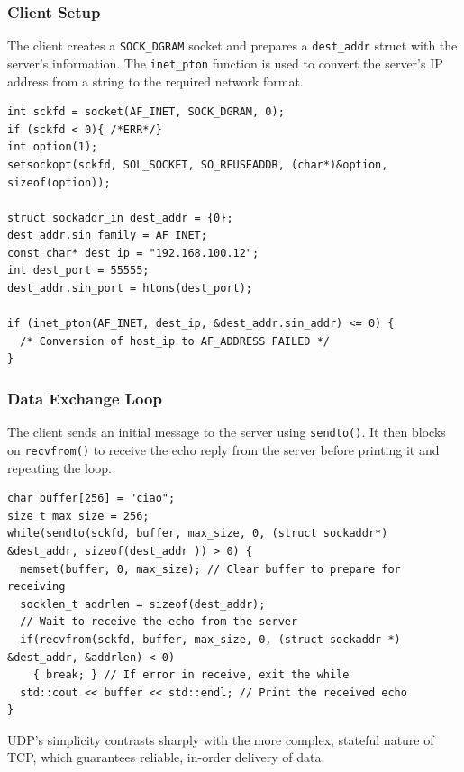\documentclass{article}
\begin{document}
\subsubsection{Client Setup}

The client creates a \texttt{SOCK\_DGRAM} socket and prepares a \texttt{dest\_addr} struct with the server's information. The \texttt{inet\_pton} function is used to convert the server's IP address from a string to the required network format.

\begin{verbatim}
int sckfd = socket(AF_INET, SOCK_DGRAM, 0);
if (sckfd < 0){ /*ERR*/}
int option(1);
setsockopt(sckfd, SOL_SOCKET, SO_REUSEADDR, (char*)&option, sizeof(option));

struct sockaddr_in dest_addr = {0};
dest_addr.sin_family = AF_INET;
const char* dest_ip = "192.168.100.12";
int dest_port = 55555;
dest_addr.sin_port = htons(dest_port);

if (inet_pton(AF_INET, dest_ip, &dest_addr.sin_addr) <= 0) {
  /* Conversion of host_ip to AF_ADDRESS FAILED */
}
\end{verbatim}

\subsubsection{Data Exchange Loop}

The client sends an initial message to the server using \texttt{sendto()}. It then blocks on \texttt{recvfrom()} to receive the echo reply from the server before printing it and repeating the loop.

\begin{verbatim}
char buffer[256] = "ciao";
size_t max_size = 256;
while(sendto(sckfd, buffer, max_size, 0, (struct sockaddr*) &dest_addr, sizeof(dest_addr )) > 0) {
  memset(buffer, 0, max_size); // Clear buffer to prepare for receiving
  socklen_t addrlen = sizeof(dest_addr);
  // Wait to receive the echo from the server
  if(recvfrom(sckfd, buffer, max_size, 0, (struct sockaddr *) &dest_addr, &addrlen) < 0)
    { break; } // If error in receive, exit the while
  std::cout << buffer << std::endl; // Print the received echo
}
\end{verbatim}

UDP's simplicity contrasts sharply with the more complex, stateful nature of TCP, which guarantees reliable, in-order delivery of data.
\end{document}
